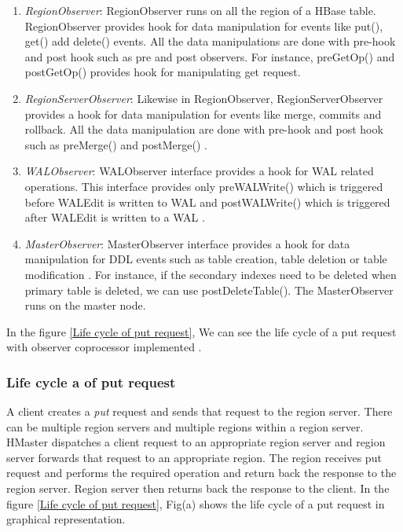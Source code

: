 \documentclass[11pt,a4paper,bibtotoc,idxtotoc,headsepline,footsepline,footexclude,BCOR12mm,DIV13]{scrbook}
\begin{document}
\begin{enumerate}
    
\item \emph{RegionObserver}: RegionObserver runs on all the region of a HBase table. RegionObserver provides hook for data manipulation for events like put(), get() add delete() events. All the data manipulations are done with pre-hook and post hook \cite{hbase:essential} such as pre and post observers. For instance, preGetOp() and postGetOp() provides hook for manipulating get request. 

\item \emph{RegionServerObserver}: Likewise in RegionObserver, RegionServerObserver provides a hook for data manipulation for events like merge, commits and rollback. All the data manipulation are done with pre-hook and post hook such as preMerge() and postMerge() \cite{hbase:essential}. 

\item \emph{WALObserver}: WALObserver interface provides a hook for WAL \cite{hbase:essential} related operations. This interface provides only preWALWrite() which is triggered before WALEdit is written to WAL and postWALWrite() which is triggered after WALEdit is written to a WAL \cite{hbase:essential}.

\item \emph{MasterObserver}: MasterObserver interface provides a hook for data manipulation for DDL events such as table creation, table deletion or table modification \cite{coprocessor:types}. For instance, if the secondary indexes need to be deleted when primary table is deleted, we can use postDeleteTable(). The MasterObserver runs on the master node.

\end{enumerate}


In the figure \ref{Life cycle of put request}, We can see the life cycle of a put request with observer coprocessor implemented \cite{coprocessor:detail}.

\subsubsection{Life cycle a of put request}
\label{subsubsec:Life cycle of put request}

A client creates a \emph{put} request and sends that request to the region server. There can be multiple region servers and multiple regions within a region server. HMaster dispatches a client request to an appropriate region server and region server forwards that request to an appropriate region. The region receives put request and performs the required operation and return back the response to the region server. Region server then returns back the response to the client. In the figure \ref{Life cycle of put request}, Fig(a) shows the life cycle of a put request in graphical representation. 
\end{document}
